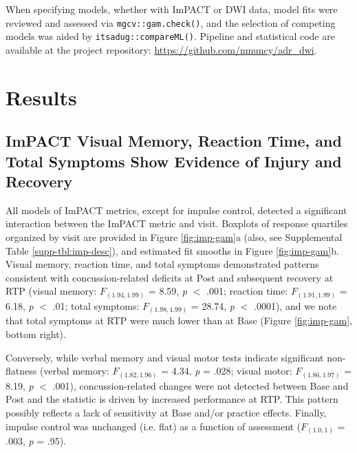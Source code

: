 \documentclass[12pt]{article}
\begin{document}
When specifying models, whether with ImPACT or DWI data, model fits were reviewed and assessed via \lstinline{mgcv::gam.check()}, and the selection of competing models was aided by \lstinline{itsadug::compareML()}. Pipeline and statistical code are available at the project repository: \url{https://github.com/nmuncy/adr_dwi}.


\section{Results}
\label{sec:res}

\subsection{ImPACT Visual Memory, Reaction Time, and Total Symptoms Show Evidence of Injury and Recovery}
\label{ssec:res-imp}
All models of ImPACT metrics, except for impulse control, detected a significant interaction between the ImPACT metric and visit. Boxplots of response quartiles organized by visit are provided in Figure \ref{fig:imp-gam}a (also, see Supplemental Table \ref{supp-tbl:imp-desc}), and estimated fit smooths in Figure \ref{fig:imp-gam}b. Visual memory, reaction time, and total symptoms demonstrated patterns consistent with concussion-related deficits at Post and subsequent recovery at RTP (visual memory: $F_{(1.94, 1.99)}$ = 8.59, \textit{p} $<$ .001; reaction time: $F_{(1.91, 1.99)}$ = 6.18, \textit{p} $<$ .01; total symptoms: $F_{(1.98, 1.99)}$ = 28.74, \textit{p} $<$ .0001), and we note that total symptoms at RTP were much lower than at Base (Figure \ref{fig:imp-gam}, bottom right).

Conversely, while verbal memory and visual motor tests indicate significant non-flatness (verbal memory: $F_{(1.82, 1.96)}$ = 4.34, \textit{p} = .028; visual motor: $F_{(1.86, 1.97)}$ = 8.19, \textit{p} $<$ .001), concussion-related changes were not detected between Base and Post and the statistic is driven by increased performance at RTP. This pattern possibly reflects a lack of sensitivity at Base and/or practice effects. Finally, impulse control was unchanged (i.e. flat) as a function of assessment ($F_{(1.0, 1)}$ = .003, \textit{p} = .95).
\end{document}
